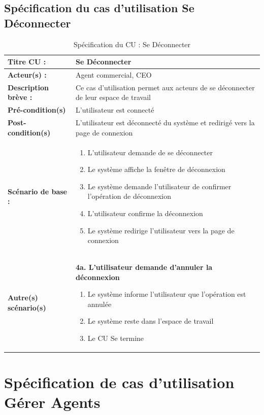 \newpage
\subsection{Spécification du cas d'utilisation Se Déconnecter}

\begin{table}[H]
\begin{tabularx}{\textwidth}{|l|X|}
\hline
\textbf{Titre CU :} & Se Déconnecter \\
\hline
\textbf{Acteur(s) :} & Agent commercial, CEO \\
\hline
\textbf{Description brève :} & Ce cas d'utilisation permet aux acteurs de se déconnecter de leur espace de travail \\
\hline
\textbf{Pré-condition(s)} & L'utilisateur est connecté \\
\hline
\textbf{Post-condition(s)} & L'utilisateur est déconnecté du système et redirigé vers la page de connexion \\
\hline
\textbf{Scénario de base :} &
\begin{enumerate}[leftmargin=1.5em, topsep=2pt, itemsep=1pt]
  \item L'utilisateur demande de se déconnecter
  \item Le système affiche la fenêtre de déconnexion
  \item Le système demande l'utilisateur de confirmer l'opération de déconnexion
  \item L'utilisateur confirme la déconnexion
  \item Le système redirige l'utilisateur vers la page de connexion
\end{enumerate} \\
\hline
\textbf{Autre(s) scénario(s)} &
\textbf{4a. L'utilisateur demande d'annuler la déconnexion}
\begin{enumerate}[leftmargin=1.5em, topsep=2pt, itemsep=1pt]
  \item Le système informe l'utilisateur que l'opération est annulée
  \item Le système reste dans l'espace de travail
  \item Le CU Se termine
\end{enumerate} \\
\hline
\end{tabularx}
\caption{Spécification du CU : Se Déconnecter}
\label{tab:cu-deconnecter}
\end{table}

\newpage
\section{Spécification de cas d'utilisation Gérer Agents}


